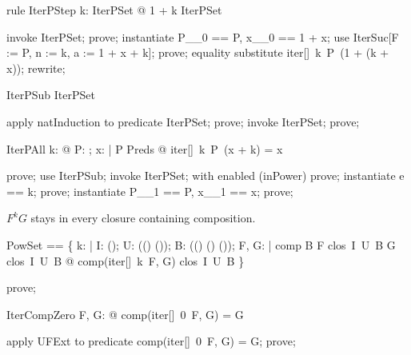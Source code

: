 \documentclass{article}
\begin{document}
\begin{theorem}{rule IterPStep}
  \forall k: IterPSet @ 1 + k \in IterPSet
\end{theorem}

\begin{zproof}
invoke IterPSet;
prove;
instantiate P\_\_0 == P, x\_\_0 == 1 + x;
use IterSuc[F := P, n := k, a := 1 + x + k];
prove;
equality substitute iter[\nat]~k~P~(1 + (k + x));
rewrite;
\end{zproof}

\begin{theorem}{IterPSub}
  \nat \subseteq IterPSet
\end{theorem}

\begin{zproof}
apply natInduction to predicate \nat \subseteq IterPSet;
prove;
invoke IterPSet;
prove;
\end{zproof}

\begin{theorem}{IterPAll}
  \forall k: \nat @ \forall P: \nat \fun \nat; x: \nat | P \in Preds @ iter[\nat]~k~P~(x + k) = x
\end{theorem}

\begin{zproof}
prove;
use IterPSub;
invoke IterPSet;
with enabled (inPower) prove;
instantiate e == k;
prove;
instantiate P\_\_1 == P, x\_\_1 == x;
prove;
\end{zproof}

$F^k G$ stays in every closure containing composition.

\begin{zed}
  PowSet == \{ k: \nat | \forall I: \power (\nat \fun \nat); U: \power ((\nat \fun \nat) \fun (\nat \fun \nat)); B: \power ((\nat \fun \nat) \cross (\nat \fun \nat) \fun (\nat \fun \nat)); F, G: \nat \fun \nat |
    comp \in B \land F \in clos~I~U~B \land G \in clos~I~U~B @ comp(iter[\nat]~k~F, G) \in clos~I~U~B \}
\end{zed}

\begin{zproof}
prove;
\end{zproof}

\begin{theorem}{IterCompZero}
  \forall F, G: \nat \fun \nat @ comp(iter[\nat]~0~F, G) = G
\end{theorem}

\begin{zproof}
apply UFExt to predicate comp(iter[\nat]~0~F, G) = G;
prove;
\end{zproof}
\end{document}
